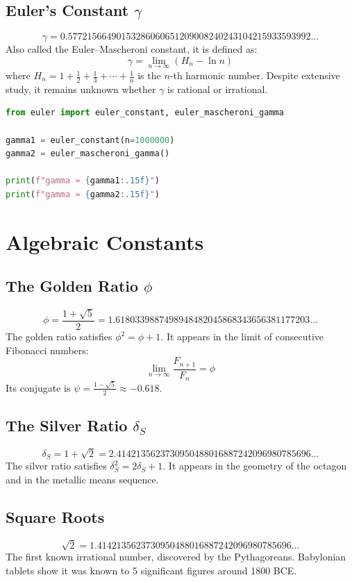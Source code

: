 \subsection{Euler's Constant $\gamma$}
\[
\gamma = 0.57721566490153286060651209008240243104215933593992\dots
\]
Also called the Euler--Mascheroni constant, it is defined as:
\[
\gamma = \lim_{n\to\infty}\left(H_n - \ln n\right)
\]
where $H_n = 1 + \frac{1}{2} + \frac{1}{3} + \cdots + \frac{1}{n}$ is the $n$-th harmonic number. Despite extensive study, it remains unknown whether $\gamma$ is rational or irrational.

\begin{lstlisting}[language=Python, caption=Computing $\gamma$]
from euler import euler_constant, euler_mascheroni_gamma

gamma1 = euler_constant(n=1000000)
gamma2 = euler_mascheroni_gamma()

print(f"gamma ≈ {gamma1:.15f}")
print(f"gamma ≈ {gamma2:.15f}")
\end{lstlisting}

\section{Algebraic Constants}

\subsection{The Golden Ratio $\phi$}
\[
\phi = \frac{1 + \sqrt{5}}{2} = 1.6180339887498948482045868343656381177203\dots
\]
The golden ratio satisfies $\phi^2 = \phi + 1$. It appears in the limit of consecutive Fibonacci numbers:
\[
\lim_{n\to\infty}\frac{F_{n+1}}{F_n} = \phi
\]
Its conjugate is $\psi = \frac{1-\sqrt{5}}{2} \approx -0.618$.

\subsection{The Silver Ratio $\delta_S$}
\[
\delta_S = 1 + \sqrt{2} = 2.4142135623730950488016887242096980785696\dots
\]
The silver ratio satisfies $\delta_S^2 = 2\delta_S + 1$. It appears in the geometry of the octagon and in the metallic means sequence.

\subsection{Square Roots}
\[
\sqrt{2} = 1.4142135623730950488016887242096980785696\dots
\]
The first known irrational number, discovered by the Pythagoreans. Babylonian tablets show it was known to 5 significant figures around 1800 BCE.

